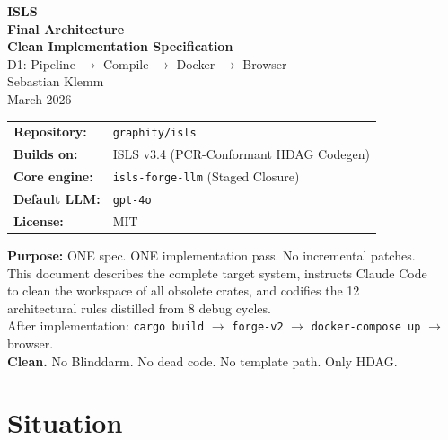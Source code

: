 \documentclass[11pt,a4paper]{article}
\begin{document}
\begin{titlepage}
\begin{center}
\vspace*{1.5cm}
{\Huge\bfseries ISLS}\\[0.4cm]
{\Huge\bfseries Final Architecture}\\[0.3cm]
{\LARGE\bfseries Clean Implementation Specification}\\[1.2cm]
{\Large D1: Pipeline $\to$ Compile $\to$ Docker $\to$ Browser}\\[1.5cm]
{\large Sebastian Klemm}\\[0.3cm]
{\small March 2026}\\[2cm]

\begin{tabular}{ll}
\textbf{Repository:} & \texttt{graphity/isls} \\
\textbf{Builds on:} & ISLS v3.4 (PCR-Conformant HDAG Codegen) \\
\textbf{Core engine:} & \texttt{isls-forge-llm} (Staged Closure) \\
\textbf{Default LLM:} & \texttt{gpt-4o} \\
\textbf{License:} & MIT \\
\end{tabular}

\vfill
{\small
\textbf{Purpose:} ONE spec. ONE implementation pass. No incremental patches.\\[0.2cm]
This document describes the complete target system, instructs Claude Code\\
to clean the workspace of all obsolete crates, and codifies the 12\\
architectural rules distilled from 8 debug cycles.\\[0.2cm]
After implementation: \texttt{cargo build} $\to$ \texttt{forge-v2} $\to$ \texttt{docker-compose up} $\to$ browser.\\[0.2cm]
\textbf{Clean.} No Blinddarm. No dead code. No template path. Only HDAG.
}
\end{center}
\end{titlepage}

\tableofcontents
\newpage

\section{Situation}
\end{document}
